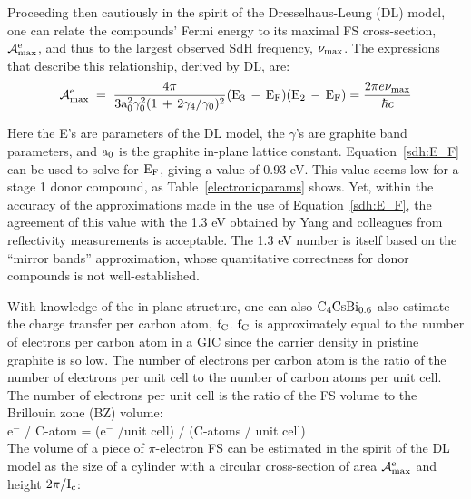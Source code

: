 	Proceeding then cautiously in  the spirit of  the Dresselhaus-Leung
(DL) model\cite{F60}, one can  relate  the compounds'  Fermi energy  to its
maximal FS cross-section,  $\rm {\cal A}_{max}^e$, and   thus to
the largest observed SdH frequency, $\rm \nu_{max}$.   The expressions that
describe this relationship, derived by DL, are:\\

\begin{equation}
\label{sdh:E_F}
\rm {\cal A}_{max}^e \; = \; \frac{4 \pi}{3a_0^2 \gamma_0^2 (1 \, + \, 2\gamma_4/\gamma_0)^2}(E_3 \, - \, E_F)(E_2 \, - \, E_F)\\
= \frac{2\pi {\mit e}\nu_{max}}{\hbar {\mit c}}
\end{equation}

\noindent Here the E's are parameters of the DL model, the $\gamma$'s are
graphite band parameters,  and $\rm a_0$  is  the graphite in-plane lattice
constant.  Equation~\ref{sdh:E_F}  can  be used  to  solve for   $\rm E_F$,
giving  a value  of 0.93  eV.   This value seems low  for a  stage  1 donor
compound, as Table~\ref{electronicparams} shows.   Yet, within the accuracy
of   the  approximations made in  the   use  of Equation~\ref{sdh:E_F}, the
agreement  of  this value with the 1.3  eV obtained by  Yang and colleagues
from reflectivity  measurements\cite{yang88} is  acceptable.   The 1.3   eV
number   is  itself  based  on  the  ``mirror bands''  approximation, whose
quantitative correctness for donor compounds is not well-established.

	With knowledge  of  the  in-plane  structure,  one  can   also $\rm
C_4CsBi_{0.6}$ also  estimate the  charge transfer  per   carbon atom, $\rm
f_C$.  $\rm  f_C$  is approximately equal  to the  number of electrons  per
carbon atom in a GIC since the carrier density  in pristine graphite  is so
low.\cite{I94} The number of electrons per carbon  atom is the ratio of the
number of electrons  per unit cell to  the number of  carbon atoms per unit
cell.  The number of electrons per unit cell is the ratio  of the FS volume
to the Brillouin zone (BZ) volume:\\

e$^-$ / C-atom = (e$^-$ /unit cell) / (C-atoms / unit cell)\\

\noindent The volume of a piece of $\pi$-electron FS can be estimated in the
 spirit of the DL model as the size of a cylinder with a
circular cross-section of area $\rm  {\cal A}_{max}^e$ and height $\rm 2\pi
/ I_c$:\\

